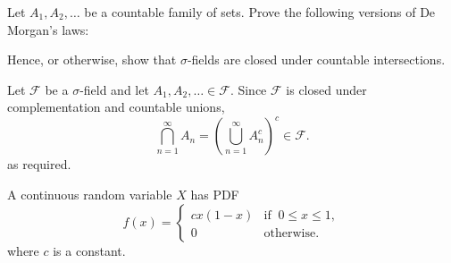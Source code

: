 \begin{exercise}
\begin{questions}
\question
Let $A_1,A_2,\ldots$ be a countable family of sets. Prove the following versions of De Morgan's laws:
Hence, or otherwise, show that $\sigma$-fields are closed under countable intersections.
\begin{answer}
Let $\mathcal{F}$ be a $\sigma$-field and let $A_1,A_2,\ldots\in\mathcal{F}$. Since $\mathcal{F}$ is closed under complementation and countable unions,
\[
\bigcap_{n=1}^{\infty} A_n = \left(\bigcup_{n=1}^{\infty} A^c_n\right)^c \in\mathcal{F}.
\] 
as required.
\end{answer}

\question
A continuous random variable $X$ has PDF
\[
f(x) = \begin{cases}
	cx(1-x)	& \text{if }\ 0\leq x\leq 1,\\
	0		& \text{otherwise.}		
\end{cases}
\]
where $c$ is a constant.
\begin{parts}

\end{parts}
\end{questions}
\end{exercise}
